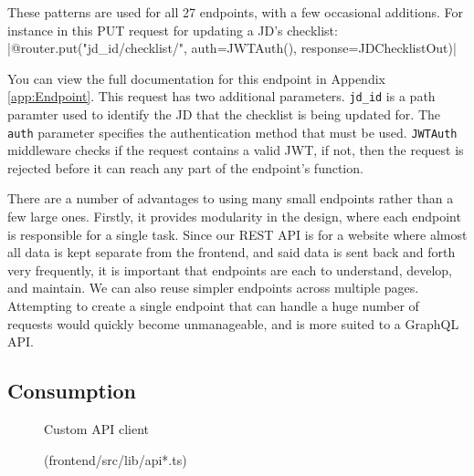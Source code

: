 These patterns are used for all 27 endpoints, with a few occasional additions. For instance in this PUT request for updating a JD's checklist:
|@router.put("{jd_id}/checklist/", auth=JWTAuth(), response=JDChecklistOut)|

You can view the full documentation for this endpoint in Appendix \ref{app:Endpoint}. This request has two additional parameters. \texttt{jd\_id} is a path paramter used to identify the JD that the checklist is being updated for. The \texttt{auth} parameter specifies the authentication method that must be used. \texttt{JWTAuth} middleware checks if the request contains a valid JWT, if not, then the request is rejected before it can reach any part of the endpoint's function.

There are a number of advantages to using many small endpoints rather than a few large ones. Firstly, it provides modularity in the design, where each endpoint is responsible for a single task. Since our REST API is for a website where almost all data is kept separate from the frontend, and said data is sent back and forth very frequently, it is important that endpoints are each to understand, develop, and maintain. We can also reuse simpler endpoints across multiple pages. Attempting to create a single endpoint that can handle a huge number of requests would quickly become unmanageable, and is more suited to a GraphQL API.

\clearpage
\subsection{Consumption}

\begin{figure}[h]
\centering
{}
\vspace{-20pt}
\caption{Custom API client}
\vspace{-10pt}
\caption*{(frontend/src/lib/api*.ts)}
\label{fig:api-lib}
\vspace{-5pt}
\end{figure}

